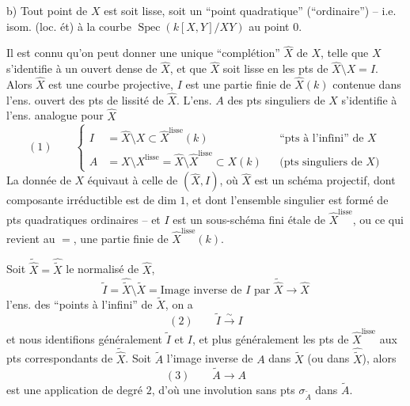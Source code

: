 b) Tout point de $X$ est soit lisse, soit un ``point quadratique'' (``ordinaire'') -- i.e. isom. (loc. ét) à la courbe $\operatorname{Spec}(k[X,Y]/XY)$ au point $0$.

Il est connu qu'on peut donner une unique ``complétion'' $\widehat X$ de $X$, telle que  $X$ s'identifie à un ouvert dense de $\widehat X$, et que $\widehat X$ soit lisse en les pts de $\widehat X\setminus X=I$. Alors $\widehat X$ est une courbe projective, $I$ est  une partie finie de $\widehat X(k)$ contenue dans l'ens. ouvert des pts de lissité de $\widehat X$. L'ens. $A$ des pts singuliers de $X$ s'identifie à l'ens. analogue pour $\widehat X$
\[
(1)\qquad
\left\{\begin{aligned}
I&=\widehat X\setminus X\subset\widehat X^{\mathrm{lisse}}(k)
&&\text{``pts à l'infini'' de }X\\
A&=X\setminus X^{\mathrm{lisse}}=\widehat X\setminus\widehat X^{\mathrm{lisse}}\subset X(k)
&&\text{(pts singuliers de }X\text{)}
\end{aligned}\right.
\]
La donnée de $X$ équivaut à celle de
$(\widehat X,I)$, où $\widehat X$ est un schéma projectif, dont  composante irréductible est de dim $1$, et dont l'ensemble singulier est formé de pts quadratiques ordinaires -- et $I$ est un sous-schéma fini étale de $\widehat X^{\mathrm{lisse}}$, ou ce qui revient au $=$, une partie finie de $\widehat X^{\mathrm{lisse}}(k)$.

Soit $\widetilde{\widehat X}=\widehat{\widetilde X}$ le normalisé de $\widehat X$, 
\[
\widetilde I=\widehat{\widetilde X}\setminus\widetilde X
=\text{Image inverse de }I\text{ par }\widetilde{\widehat X}\to\widehat X
\]
l'ens. des  ``points à l'infini'' de $\widetilde X$, on a
\[
(2)\qquad\widetilde I\xrightarrow{\sim}I
\]
et nous identifions généralement $\widetilde I$ et $I$, et plus généralement  les pts de $\widehat X^{\mathrm{lisse}}$ aux pts correspondants de $\widetilde{\widehat X}$. Soit $\widetilde A$ l'image inverse de $A$ dans $\widetilde X$ (ou dans $\widehat{\widetilde X}$), alors
\[
(3)\qquad\widetilde A\longrightarrow A
\]
est une application de degré $2$, d'où une involution sans pts  $\sigma_{\widetilde A}$ dans $\widetilde A$.

